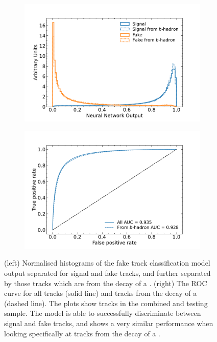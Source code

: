 \begin{figure}[!htbp]
  \centering
  \begin{subfigure}[b]{0.48\textwidth}
      \centering
      \includegraphics[width=\textwidth]{chapters/4.track_classifier/figs/fake_id_output.pdf}
  \end{subfigure}
  \quad
  \begin{subfigure}[b]{0.48\textwidth}
      \centering
      \includegraphics[width=\textwidth]{chapters/4.track_classifier/figs/fake_id_roc.pdf}
  \end{subfigure}
  \caption{
    (left) Normalised histograms of the fake track classification model output separated for signal and fake tracks, and further separated by those tracks which are from the decay of a \bhadron.
    (right) The ROC curve for all tracks (solid line) and tracks from the decay of a \bhadron (dashed line).
    The plots show tracks in the combined \ttbar and \Zprime testing sample.
    The model is able to successfully discriminate between signal and fake tracks, and shows a very similar performance when looking specifically at tracks from the decay of a \bhadron.
  }
  \label{fig:track_classifier_output_roc}
\end{figure}

